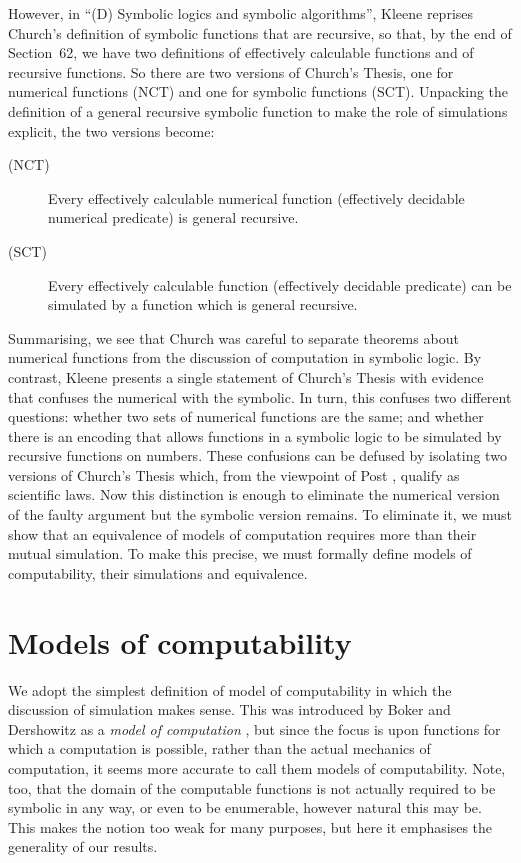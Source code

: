 \documentclass[a4paper]{article}
\begin{document}
However, in ``(D) Symbolic logics and symbolic algorithms'', Kleene
reprises Church's definition of symbolic functions that are recursive,
so that, by the end of Section~62, we have two definitions of
effectively calculable functions and of recursive functions. So there
are two versions of Church's Thesis, one for numerical functions (NCT)
and one for symbolic functions (SCT).  Unpacking the definition of a
general recursive symbolic function to make the role of simulations
explicit, the two versions become:

\begin{description}
\item [(NCT)]  Every effectively calculable numerical function (effectively decidable numerical predicate) is general recursive. 
\end{description}

\begin{description}
\item [(SCT)]  Every effectively calculable function (effectively decidable predicate) can be simulated by a function which is general recursive. 
\end{description}


Summarising, we see that Church was careful to separate theorems about
numerical functions from the discussion of computation in symbolic
logic. By contrast, Kleene presents a single statement of Church's
Thesis with evidence that confuses the numerical with the symbolic.
In turn, this confuses two different questions: whether two sets of
numerical functions are the same; and whether there is an encoding
that allows functions in a symbolic logic to be simulated by recursive
functions on numbers.  These confusions can be defused by isolating
two versions of Church's Thesis which, from the viewpoint of Post
\cite{post}, qualify as scientific laws. Now this distinction is
enough to eliminate the numerical version of the faulty argument but
the symbolic version remains.  To eliminate it, we must show that an
equivalence of models of computation requires more than their mutual
simulation.  To make this precise, we must formally define models of
computability, their simulations and equivalence.


\section{Models of computability} 
\label{sec:models}

We adopt the simplest definition of model of computability in which
the discussion of simulation makes sense. This was introduced by
Boker and Dershowitz as a {\em model of computation} \cite{BokerD06},
but since the focus is upon functions for which a computation is
possible, rather than the actual mechanics of computation, it seems
more accurate to call them models of computability. Note, too, that
the domain of the computable functions is not actually required to be
symbolic in any way, or even to be enumerable, however natural this
may be. This makes the notion too weak for many purposes, but here it
emphasises the generality of our results. 
\end{document}
